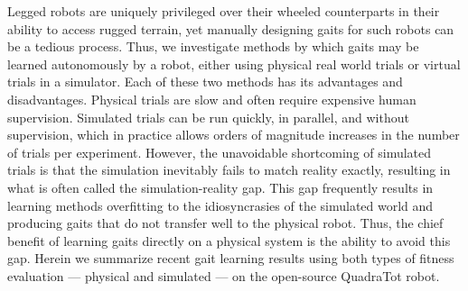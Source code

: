 Legged robots are uniquely privileged over their wheeled counterparts
in their ability to access rugged terrain, yet manually designing gaits for
such robots can be a tedious process. Thus, we
investigate methods by which gaits may be learned autonomously by a
robot, either using physical real world trials or virtual trials in a
simulator. Each of these two methods has its advantages and
disadvantages. Physical trials are slow and often require expensive
human supervision. Simulated trials can be run quickly, in parallel,
and without supervision, which in practice allows orders of magnitude
increases in the number of trials per experiment. However, the
unavoidable shortcoming of simulated trials is that the simulation
inevitably fails to match reality exactly, resulting in what is often
called the simulation-reality gap. This gap frequently results in
learning methods overfitting to the idiosyncrasies of the simulated
world and producing gaits that do not transfer well to the physical
robot.  Thus, the chief benefit of learning gaits directly on a
physical system is the ability to avoid this gap. Herein we summarize
recent gait learning results using both types of fitness evaluation
--- physical and simulated --- on the open-source QuadraTot robot.

